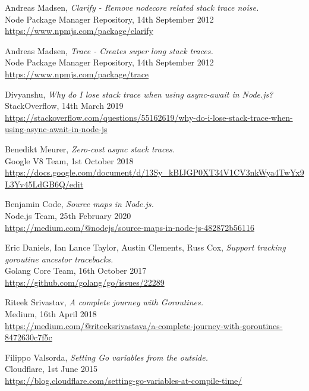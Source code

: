 \documentclass[12pt,pdftex,titlepage]{report}
\begin{document}
\begin{thebibliography}{69}
        Andreas Madsen, \textit{Clarify - Remove nodecore related stack trace noise.} \\
        Node Package Manager Repository, 14th September 2012 \\
        \url{https://www.npmjs.com/package/clarify}
        
        Andreas Madsen, \textit{Trace - Creates super long stack traces.} \\
        Node Package Manager Repository, 14th September 2012 \\
        \url{https://www.npmjs.com/package/trace}
        
        Divyanshu, \textit{Why do I lose stack trace when using async-await in Node.js?} \\
        StackOverflow, 14th March 2019 \\
        \url{https://stackoverflow.com/questions/55162619/why-do-i-lose-stack-trace-when-using-async-await-in-node-js}

        Benedikt Meurer, \textit{Zero-cost async stack traces.} \\
        Google V8 Team, 1st October 2018 \\
        \url{https://docs.google.com/document/d/13Sy_kBIJGP0XT34V1CV3nkWya4TwYx9L3Yv45LdGB6Q/edit}

        Benjamin Code, \textit{Source maps in Node.js.} \\
        Node.js Team, 25th February 2020 \\
        \url{https://medium.com/@nodejs/source-maps-in-node-js-482872b56116}

        Eric Daniels, Ian Lance Taylor, Austin Clements, Russ Cox, \textit{Support tracking goroutine ancestor tracebacks.} \\
        Golang Core Team, 16th October 2017 \\
        \url{https://github.com/golang/go/issues/22289}
        
        Riteek Srivastav, \textit{A complete journey with Goroutines.} \\
        Medium, 16th April 2018 \\
        \url{https://medium.com/@riteeksrivastava/a-complete-journey-with-goroutines-8472630c7f5c}

        Filippo Valsorda, \textit{Setting Go variables from the outside.} \\
        Cloudflare, 1st June 2015 \\
        \url{https://blog.cloudflare.com/setting-go-variables-at-compile-time/}


\end{thebibliography}
\end{document}
